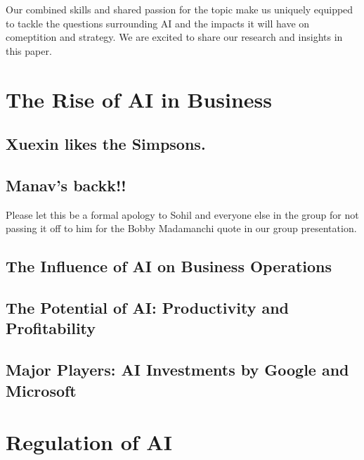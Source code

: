 \documentclass[
]{book}
\begin{document}
Our combined skills and shared passion for the topic make us uniquely equipped to tackle the questions surrounding AI and the impacts it will have on comeptition and strategy. We are excited to share our research and insights in this paper.

\hypertarget{the-rise-of-ai-in-business}{%
\chapter{The Rise of AI in Business}\label{the-rise-of-ai-in-business}}

\hypertarget{xuexin-likes-the-simpsons.}{%
\section{Xuexin likes the Simpsons.}\label{xuexin-likes-the-simpsons.}}

\hypertarget{manavs-backk}{%
\section{Manav's backk!!}\label{manavs-backk}}

Please let this be a formal apology to Sohil and everyone else in the group for not passing it off to him for the Bobby Madamanchi quote in our group presentation.

\hypertarget{the-influence-of-ai-on-business-operations}{%
\section{The Influence of AI on Business Operations}\label{the-influence-of-ai-on-business-operations}}

\hypertarget{the-potential-of-ai-productivity-and-profitability}{%
\section{The Potential of AI: Productivity and Profitability}\label{the-potential-of-ai-productivity-and-profitability}}

\hypertarget{major-players-ai-investments-by-google-and-microsoft}{%
\section{Major Players: AI Investments by Google and Microsoft}\label{major-players-ai-investments-by-google-and-microsoft}}

\hypertarget{regulation-of-ai}{%
\chapter{Regulation of AI}\label{regulation-of-ai}}
\end{document}
